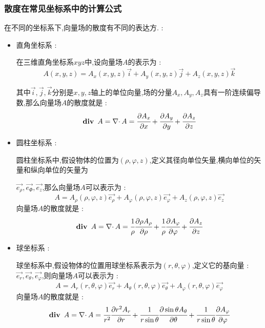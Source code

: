 \documentclass[UTF8,12pt]{ctexbook}
\newcommand{\partialDerivativeFrac}[2]{\cfrac{\partial #1}{\partial #2}}
\DeclareMathOperator{\divergenceText}{\mathbf{div}\ }
\DeclareMathOperator{\divergenceSymbol}{\nabla\cdot}
\begin{document}
{{{{    \subsubsection{散度在常见坐标系中的计算公式}{
      在不同的坐标系下,向量场的散度有不同的表达方. :
      \begin{itemize}
        \item {
              直角坐标系 :

              在三维直角坐标系$xyz$中,设向量场$A$的表示为 :
              $$
                A(x,y,z) = A_x(x,y,z)\vec{i} + A_y(x,y,z)\vec{j} + A_z(x,y,z)\vec{k}
              $$

              其中$\vec{i},\vec{j},\vec{k}$分别是$x,y,z$轴上的单位向量,场的分量$A_x,A_y,A_z$具有一阶连续偏导数,那么向量场$A$的散度就是 :
              $$
                \divergenceText A = \divergenceSymbol A = \partialDerivativeFrac{A_x}{x} + \partialDerivativeFrac{A_y}{y} + \partialDerivativeFrac{A_z}{z}
              $$
              }
        \item {
              圆柱坐标系 :

              圆柱坐标系中,假设物体的位置为$(\rho,\varphi,z)$,定义其径向单位矢量,横向单位的矢量和纵向单位的矢量为

              $\vec{e_{\rho}},\vec{e_{\varPhi}},\vec{e_z}$,那么向量场$A$可以表示为 :
              $$
                A = A_{\rho}(\rho,\varphi,z)\vec{e_{\rho}} + A_{\varphi}(\rho,\varphi,z)\vec{e_{\varphi}} + A_{z}(\rho,\varphi,z)\vec{e_{z}}
              $$
              向量场$A$的散度就是 :
              $$
                \divergenceText A = \divergenceSymbol A = \cfrac{1}{\rho}\partialDerivativeFrac{\rho A_\rho}{\rho} + \cfrac{1}{\rho}\partialDerivativeFrac{A_\varphi}{\varphi} + \partialDerivativeFrac{A_z}{z}
              $$
              }
        \item {
              球坐标系 :

              球坐标系中,假设物体的位置用球坐标系表示为$(r,\theta,\varphi)$,定义它的基向量 : $\vec{e_r},\vec{e_\theta},\vec{e_\varphi}$,则向量场$A$可以表示为 :
              $$
                A = A_r(r,\theta,\varphi)\vec{e_r} + A_\theta(r,\theta,\varphi)\vec{e_\theta} + A_\varphi(r,\theta,\varphi)\vec{e_\varphi}
              $$
              向量场$A$的散度就是 :
              $$
                \divergenceText A = \divergenceSymbol A = \cfrac{1}{r^2}\partialDerivativeFrac{r^2A_r}{r} + \cfrac{1}{r\sin\theta}\partialDerivativeFrac{\sin\theta A_\theta}{\theta} + \cfrac{1}{r\sin\theta}\partialDerivativeFrac{A_\varphi}{\varphi}
              $$
              }
      \end{itemize}
    }%

}}}}
\end{document}
